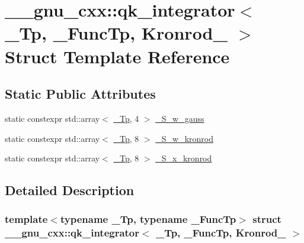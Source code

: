\hypertarget{struct____gnu__cxx_1_1qk__integrator_3_01__Tp_00_01__FuncTp_00_01Kronrod__15_01_4}{}\section{\+\_\+\+\_\+gnu\+\_\+cxx\+:\+:qk\+\_\+integrator$<$ \+\_\+\+Tp, \+\_\+\+Func\+Tp, Kronrod\+\_ $>$ Struct Template Reference}
\label{struct____gnu__cxx_1_1qk__integrator_3_01__Tp_00_01__FuncTp_00_01Kronrod__15_01_4}
\subsection*{Static Public Attributes}
\begin{DoxyCompactItemize}
\item 
static constexpr std\+::array$<$ \hyperlink{namespace____gnu__cxx_a3b19a9c800ca194374ef9172290f7d79}{\+\_\+\+Tp}, 4 $>$ \hyperlink{struct____gnu__cxx_1_1qk__integrator_3_01__Tp_00_01__FuncTp_00_01Kronrod__15_01_4_aa127e01fbda9767c7602b5bf6db15bb4}{\+\_\+\+S\+\_\+w\+\_\+gauss}
\item 
static constexpr std\+::array$<$ \hyperlink{namespace____gnu__cxx_a3b19a9c800ca194374ef9172290f7d79}{\+\_\+\+Tp}, 8 $>$ \hyperlink{struct____gnu__cxx_1_1qk__integrator_3_01__Tp_00_01__FuncTp_00_01Kronrod__15_01_4_adc8a907d3714406cbb1cf5df42c26d64}{\+\_\+\+S\+\_\+w\+\_\+kronrod}
\item 
static constexpr std\+::array$<$ \hyperlink{namespace____gnu__cxx_a3b19a9c800ca194374ef9172290f7d79}{\+\_\+\+Tp}, 8 $>$ \hyperlink{struct____gnu__cxx_1_1qk__integrator_3_01__Tp_00_01__FuncTp_00_01Kronrod__15_01_4_a300459f400f0ca243e6817105ab79f27}{\+\_\+\+S\+\_\+x\+\_\+kronrod}
\end{DoxyCompactItemize}


\subsection{Detailed Description}
\subsubsection*{template$<$typename \+\_\+\+Tp, typename \+\_\+\+Func\+Tp$>$\newline
struct \+\_\+\+\_\+gnu\+\_\+cxx\+::qk\+\_\+integrator$<$ \+\_\+\+Tp, \+\_\+\+Func\+Tp, Kronrod\+\_ $>$}

